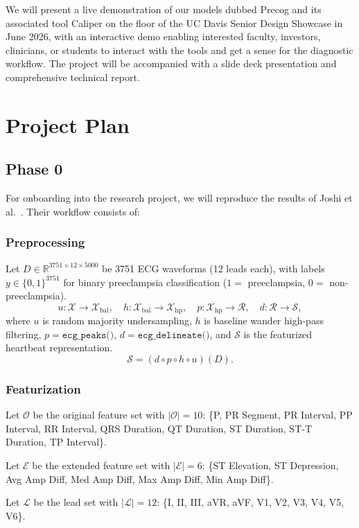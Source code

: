 \documentclass[sigconf,nonacm]{acmart}
\begin{document}
We will present a live demonstration of our models dubbed Precog and its associated tool Caliper on the floor of the UC Davis Senior Design Showcase in June 2026, with an interactive demo enabling interested faculty, investors, clinicians, or students to interact with the tools and get a sense for the diagnostic workflow. The project will be accompanied with a slide deck presentation and comprehensive technical report.

  \section{Project Plan}

\subsection{Phase 0}
For onboarding into the research project, we will reproduce the results of Joshi et al.~\cite{joshi2025linkingecgecho}. Their workflow consists of:
\subsubsection{Preprocessing}
Let \(D\in\mathbb{R}^{3751\times 12\times 5000}\) be 3751 ECG waveforms (12 leads each), with labels \(y\in\{0,1\}^{3751}\) for binary preeclampsia classification (\(1=\) preeclampsia, \(0=\) non-preeclampsia).
\[
u:\mathcal{X}\to\mathcal{X}_{\mathrm{bal}},\quad
h:\mathcal{X}_{\mathrm{bal}}\to\mathcal{X}_{\mathrm{hp}},\quad
p:\mathcal{X}_{\mathrm{hp}}\to\mathcal{R},\quad
d:\mathcal{R}\to\mathcal{S},
\]
where \(u\) is random majority undersampling, \(h\) is baseline wander high-pass filtering, \(p=\texttt{ecg\_peaks()}\), \(d=\texttt{ecg\_delineate()}\), and \(\mathcal{S}\) is the featurized heartbeat representation.
\[
\mathcal{S}=(d\circ p\circ h\circ u)(D).
\]

\subsubsection{Featurization}

Let $\mathcal{O}$ be the original feature set with $|\mathcal{O}|=10$:
\{P, PR Segment, PR Interval, PP Interval, RR Interval, QRS Duration, QT Duration, ST Duration, ST-T Duration, TP Interval\}.

Let $\mathcal{E}$ be the extended feature set with $|\mathcal{E}|=6$:
\{ST Elevation, ST Depression, Avg Amp Diff, Med Amp Diff, Max Amp Diff, Min Amp Diff\}.

Let $\mathcal{L}$ be the lead set with $|\mathcal{L}|=12$:
\{I, II, III, aVR, aVF, V1, V2, V3, V4, V5, V6\}.
\end{document}
